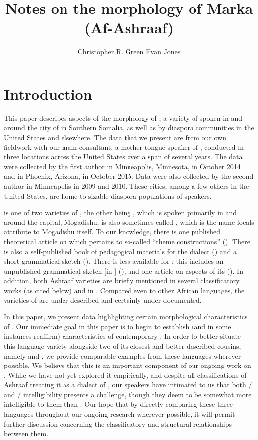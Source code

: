 \documentclass[output=paper]{LSP/langsci}
\author{Christopher R. Green\affiliation{Syracuse University} 
\lastand Evan Jones\affiliation{University of Maryland}  
}
\title{Notes on the morphology of Marka (Af-Ashraaf)}
\begin{document}
\newcommand{\emphgj}[1]{\textit{#1}} %
\section{Introduction} 
 

 This paper describes aspects of the morphology of , a variety of  spoken in and around the city of  in Southern Somalia, as well as by diaspora communities in the United States and elsewhere. The data that we present are from our own fieldwork with our main consultant, a mother tongue speaker of , conducted in three locations across the United States over a span of several years. The data were collected by the first author in Minneapolis, Minnesota, in October 2014 and in Phoenix, Arizona, in October 2015. Data were also collected by the second author in Minneapolis in 2009 and 2010. These cities, among a few others in the United States, are home to sizable diaspora populations of  speakers. 
 
  is one of two varieties of , the other being , which is spoken primarily in and around the  capital, Mogadishu;  is also sometimes called , which is the name locals attribute to Mogadishu itself. To our knowledge, there is one published theoretical article on  which pertains to so-called ``{theme constructions}'' (\citealt{Ajello1984}). There is also a self-published book of pedagogical materials for the dialect (\citealt{Abo2007}) and a short grammatical sketch (\citealt{Moreno1953}). There is less available for ; this includes an unpublished grammatical sketch [in ] (\citealt{Lamberti1980}), and one article on aspects of its  (\citealt{Ajello1988}). In addition, both Ashraaf varieties are briefly mentioned in several classificatory works (as cited below) and in \citet{Banti2011}. Compared even to other African languages, the varieties of  are under-described and certainly under-documented.
 
 In this paper, we present data highlighting certain morphological characteristics of . Our immediate goal in this paper is to begin to establish (and in some instances reaffirm) characteristics of contemporary . In order to better situate this language variety alongside two of its closest and better-described cousins, namely  and , we provide comparable examples from these languages wherever possible. We believe that this is an important component of our ongoing work on . While we have not yet explored it empirically, and despite all classifications of Ashraaf treating it as a dialect of , our  speakers have intimated to us that both / and / intelligibility presents a challenge, though they deem  to be somewhat more intelligible to them than . Our hope that by directly comparing these three languages throughout our ongoing research wherever possible, it will permit further discussion concerning the classificatory and structural relationships between them. 
 
\end{document}
